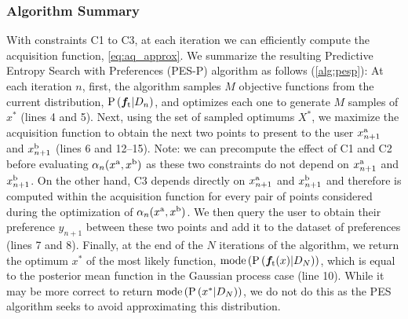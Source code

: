 \subsubsection{Algorithm Summary}
With constraints C1 to C3, at each iteration we can efficiently compute the
acquisition function, \cref{eq:aq_approx}. We summarize the resulting Predictive
Entropy Search with Preferences (PES-P) algorithm as follows (\cref{alg:pesp}):
At each iteration $n$, first, the algorithm samples $M$ objective functions from
the current distribution, $\prob{\vecf{f}[\tn{t}]|D_n}$, and optimizes each one
to generate $M$ samples of $x^*$ (lines 4 and 5).  Next, using the set of
sampled optimums $X^*$, we maximize the acquisition function to obtain the next
two points to present to the user $x_{n+1}^{\mathrm{a}}$ and $x_{n+1}^{\mathrm{b}}$ (lines 6
and 12--15). Note: we can precompute the effect of C1 and C2 before evaluating
$\funcil{\alpha}[n]{x^\tn{a}, x^\tn{b}}$ as these two constraints do not depend
on $x_{n+1}^{\mathrm{a}}$ and $x_{n+1}^{\mathrm{b}}$. On the other hand, C3 depends directly
on $x_{n+1}^{\mathrm{a}}$ and $x_{n+1}^{\mathrm{b}}$ and therefore is computed within the
acquisition function for every pair of points considered during the optimization
of $\funcil{\alpha}[n]{x^\tn{a}, x^\tn{b}}$. We then query the user to obtain
their preference $y_{n+1}$ between these two points and add it to the dataset of
preferences (lines 7 and 8). Finally, at the end of the $N$ iterations of the
algorithm, we return the optimum $x^*$ of the most likely function,
$\func{mode}{\prob{\vecf{f}[\tn{t}](x)| D_N}}$, which is equal to the posterior
mean function in the Gaussian process case (line 10). While it may be more
correct to return $\func{mode}{\prob{x^*|D_N}}$, we do not do this as the PES
algorithm seeks to avoid approximating this distribution.

